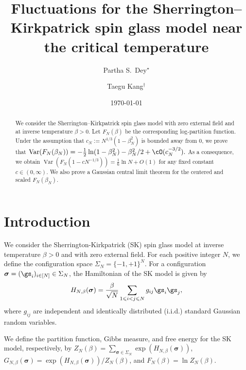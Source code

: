 \documentclass[letterpaper,11pt,reqno]{amsart}
\renewcommand{\leq}{\leqslant}
\newcommand{\mvgs}{\boldsymbol{\sigma}}\newcommand{\mvgS}{\boldsymbol{\Sigma}}\newcommand{\mvgt}{\boldsymbol{\tau}}
\DeclareMathOperator{\var}{Var}
\begin{document}
\title[SK model near the critical temperature]{Fluctuations for the Sherrington--Kirkpatrick spin glass model near the critical temperature}
\author[Dey]{Partha S.~Dey$^\star$}
\author[Kang]{Taegu Kang$^\dag$}
\date{\today}
\address{Department of Mathematics, University of Illinois Urbana--Champaign, 1305 W.~Green Street, Urbana, Illinois 61801}


\begin{abstract}
        We consider the Sherrington--Kirkpatrick spin glass model with zero external field and at inverse temperature $\beta>0$. Let $F_N(\beta)$ be the corresponding log-partition function. Under the assumption that $c_N:=N^{1/3}(1-\beta_N^2)$ is bounded away from $0$, we prove that 
        $
        \var(F_N(\beta_N)) = - \frac{1}{2} \ln (1-\beta_N^2) -{\beta_N^2}/{2} + \cO( c_N^{-3/2}).
        $
        As a consequence, we obtain $\var(F_N(1-c N^{-1/3})) = \frac16\ln N + O(1)$ for any fixed constant $c\in(0,\infty)$.
        We also prove a Gaussian central limit theorem for the centered and scaled $F_N(\beta_N)$.
\end{abstract}

\maketitle

\section{Introduction}

We consider the Sherrington-Kirkpatrick (SK) spin glass model at inverse temperature \(\beta>0\) and with zero external field.
For each positive integer $N$, we define the configuration space \( \Sigma_N = \{ -1, +1 \}^N \).
For a configuration \(\mvgs=(\gs_i)_{i\in[N]} \in \Sigma_N\), the Hamiltonian of the SK model is given by
\begin{align*}
    H_{N,\beta}(\mvgs) 
    = \frac{\beta}{\sqrt{N}} \sum_{1 \leq i< j \leq N} g_{ij} \gs_i \gs_j,
\end{align*}
where \(g_{ij}\) are independent and identically distributed (i.i.d.) standard Gaussian random variables.

We define the partition function, Gibbs measure, and free energy for the SK model, respectively, by
\(
Z_N(\beta) = \sum_{\mvgs \in \Sigma_N} \exp({H_{N,\beta} (\mvgs)})\), 
\(G_{N,\beta}(\mvgs) = \exp(H_{N,\beta}(\mvgs)) / Z_N(\beta)\), and 
\( F_N(\beta) = \ln Z_N(\beta)\).
\end{document}
